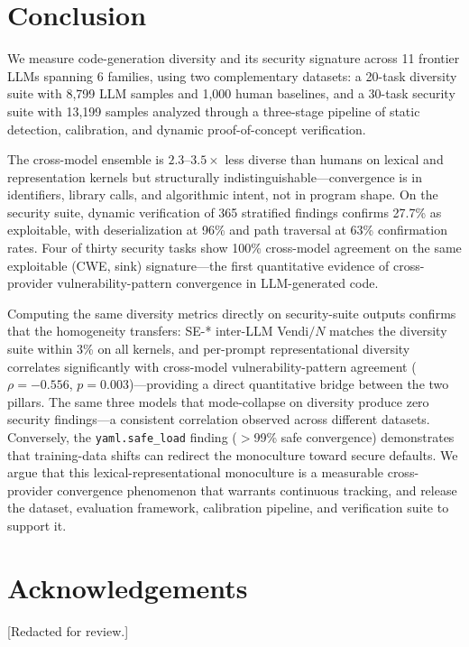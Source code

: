 \documentclass{article}
\newcommand{\code}[1]{\texttt{#1}}
\begin{document}
\section{Conclusion}
\label{sec:conclusion}

We measure code-generation diversity and its security signature across 11
frontier LLMs spanning 6 families, using two complementary datasets: a
20-task diversity suite with 8,799 LLM samples and 1,000 human baselines,
and a 30-task security suite with 13,199 samples analyzed through a
three-stage pipeline of static detection, calibration, and dynamic
proof-of-concept verification.

The cross-model ensemble is $2.3$--$3.5\times$ less diverse than humans on
lexical and representation kernels but structurally indistinguishable---convergence
is in identifiers, library calls, and algorithmic intent, not in program
shape. On the security suite, dynamic verification of 365 stratified
findings confirms 27.7\% as exploitable, with deserialization at 96\% and
path traversal at 63\% confirmation rates. Four of thirty security tasks show
100\% cross-model agreement on the same exploitable (CWE, sink)
signature---the first quantitative evidence of cross-provider
vulnerability-pattern convergence in LLM-generated code.

Computing the same diversity metrics directly on security-suite outputs
confirms that the homogeneity transfers: SE-* inter-LLM Vendi$/N$ matches
the diversity suite within 3\% on all kernels, and per-prompt
representational diversity correlates significantly with cross-model
vulnerability-pattern agreement ($\rho = -0.556$, $p = 0.003$)---providing
a direct quantitative bridge between the two pillars.
The same three models that mode-collapse on diversity produce zero security
findings---a consistent correlation observed across different datasets.
Conversely, the \code{yaml.safe\_load} finding ($>$99\% safe convergence)
demonstrates that training-data shifts can redirect the monoculture toward
secure defaults. We argue that this lexical-representational monoculture is
a measurable cross-provider convergence phenomenon that warrants continuous
tracking, and release the dataset, evaluation framework, calibration
pipeline, and verification suite to support it.

\section*{Acknowledgements}
[Redacted for review.]
\end{document}
